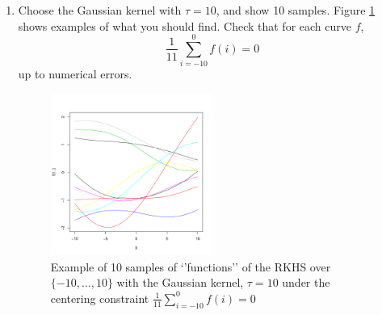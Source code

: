 \documentclass{article}[12pt]
\begin{document}
\begin{enumerate}
\item Choose the Gaussian kernel with $\tau=10$, and show 10 samples. Figure \ref{fig:Gauss_constraint} shows examples of what you should find. Check that for each curve $f$, 
\begin{equation}
\frac{1}{11}\sum_{i=-10}^0 f(i)=0
\end{equation}
up to numerical errors.  
\begin{figure}
\includegraphics[width=0.5\textwidth]{Gauss.pdf}
\caption{\label{fig:Gauss_constraint}Example of 10 samples of \lq{}\rq{}functions\rq\rq{} of the RKHS over $\{-10,\ldots,10\}$ with the Gaussian kernel, $\tau=10$ under the centering constraint $\frac{1}{11}\sum_{i=-10}^0 f(i)=0$}
\end{figure}
\end{enumerate}
\end{document}
